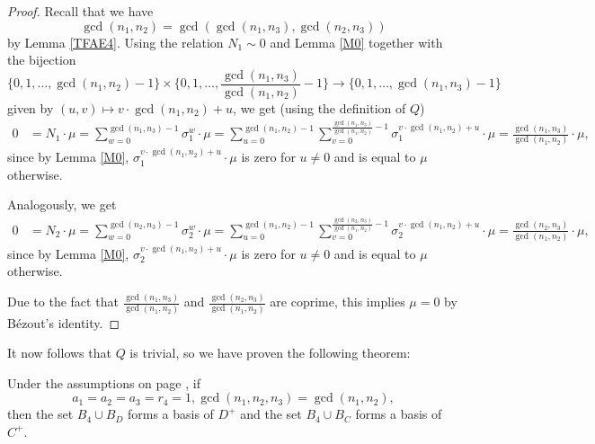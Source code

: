 \begin{proof}
Recall that we have $$\gcd(n_1,n_2)=\gcd(\gcd(n_1,n_3),\gcd(n_2,n_3))$$ by Lemma \ref{TFAE4}. Using the relation $N_1\sim 0$ and Lemma \ref{M0} together with the bijection $$\{0,1,\dots,\gcd(n_1,n_2)-1\}\times \{0,1,\dots,\frac{\gcd(n_1,n_3)}{\gcd(n_1,n_2)}-1\}\to \{0,1,\dots, \gcd(n_1,n_3)-1\}$$
given by $(u,v)\mapsto v\cdot \gcd(n_1,n_2)+u$, we get (using the definition of $Q$)
\begin{align*}
0&=N_1\cdot \mu=\sum_{w=0}^{\gcd(n_1,n_3)-1}\sigma_1^w\cdot \mu=\sum_{u=0}^{\gcd(n_1,n_2)-1}\sum_{v=0}^{\frac{\gcd(n_1,n_3)}{\gcd(n_1,n_2)}-1}\sigma_1^{ v\cdot \gcd(n_1,n_2)+u}\cdot \mu
=\frac{\gcd(n_1,n_3)}{\gcd(n_1,n_2)}\cdot \mu,
\end{align*}
since by Lemma \ref{M0}, $\sigma_1^{ v\cdot \gcd(n_1,n_2)+u}\cdot \mu$ is zero for $u\neq 0$ and is equal to $\mu$ otherwise.

Analogously, we get 
\begin{align*}
0&=N_2\cdot \mu=\sum_{w=0}^{\gcd(n_2,n_3)-1}\sigma_2^w\cdot \mu=\sum_{u=0}^{\gcd(n_1,n_2)-1}\sum_{v=0}^{\frac{\gcd(n_2,n_3)}{\gcd(n_1,n_2)}-1}\sigma_2^{ v\cdot \gcd(n_1,n_2)+u}\cdot \mu
=\frac{\gcd(n_2,n_3)}{\gcd(n_1,n_2)}\cdot \mu,
\end{align*}
since by Lemma \ref{M0}, $\sigma_2^{ v\cdot \gcd(n_1,n_2)+u}\cdot \mu$ is zero for $u\neq 0$ and is equal to $\mu$ otherwise.

Due to the fact that $\frac{\gcd(n_1,n_3)}{\gcd(n_1,n_2)}$ and $\frac{\gcd(n_2,n_3)}{\gcd(n_1,n_2)}$ are coprime, this implies $\mu=0$ by Bézout's identity.
\end{proof}

It now follows that $Q$ is trivial, so we have proven the following theorem:
\begin{theorem}\label{th4}
Under the assumptions on page \pageref{assum}, if $$a_1=a_2=a_3=r_4=1,\gcd(n_1,n_2,n_3)=\gcd(n_1,n_2),$$ then the set $B_{4}\cup B_D$ forms a basis of $D^+$ and the set $B_{4}\cup B_C$ forms a basis of $C^+$.
\end{theorem}
